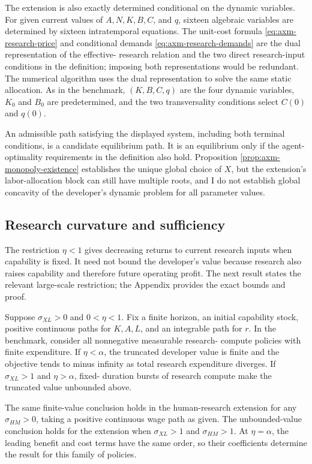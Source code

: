 The extension is also exactly determined conditional on the dynamic variables.
For given current values of \(A,N,K,B,C\), and \(q\), sixteen algebraic
variables are determined by sixteen intratemporal equations. The unit-cost formula
\eqref{eq:axm-research-price} and conditional demands
\eqref{eq:axm-research-demands} are the dual representation of the effective-
research relation and the two direct research-input conditions in the
definition; imposing both representations would be redundant. The numerical
algorithm uses the dual representation to solve the same static allocation.
As in the benchmark, \((K,B,C,q)\) are the four dynamic variables, \(K_0\) and
\(B_0\) are predetermined, and the two transversality conditions select
\(C(0)\) and \(q(0)\).

An admissible path satisfying the displayed system, including both terminal
conditions, is a candidate equilibrium path. It is an equilibrium only if the
agent-optimality requirements in the definition also hold. Proposition
\ref{prop:axm-monopoly-existence} establishes the unique global choice of \(X\),
but the extension's labor-allocation block can still have multiple roots, and I
do not establish global concavity of the developer's dynamic problem for all
parameter values.

\subsection{Research curvature and sufficiency}

The restriction \(\eta<1\) gives decreasing returns to current research inputs
when capability is fixed. It need not bound the developer's value because
research also raises capability and therefore future operating profit. The next
result states the relevant large-scale restriction; the Appendix provides the
exact bounds and proof.

\begin{proposition}
\label{prop:axm-research-burst}
Suppose \(\sigma_{XL}>0\) and \(0<\eta<1\). Fix a finite horizon, an initial
capability stock, positive continuous paths for \(K,A,L\), and an integrable
path for \(r\). In the benchmark, consider all nonnegative measurable research-
compute policies with finite expenditure. If \(\eta<\alpha\), the truncated
developer value is finite and the objective tends to minus infinity as total
research expenditure diverges. If \(\sigma_{XL}>1\) and \(\eta>\alpha\), fixed-
duration bursts of research compute make the truncated value unbounded above.

The same finite-value conclusion holds in the human-research extension for any
\(\sigma_{HM}>0\), taking a positive continuous wage path as given. The
unbounded-value conclusion holds for the extension when
\(\sigma_{XL}>1\) and \(\sigma_{HM}>1\). At \(\eta=\alpha\), the leading benefit
and cost terms have the same order, so their coefficients determine the result
for this family of policies.
\end{proposition}

